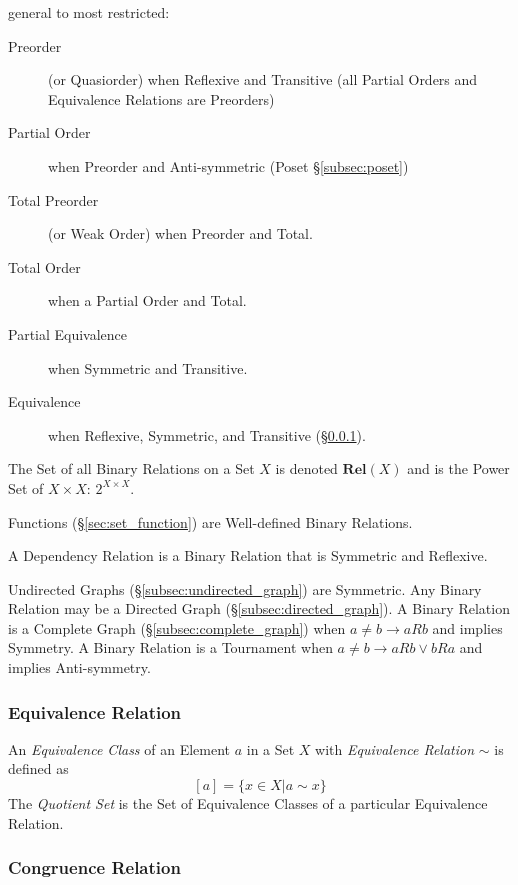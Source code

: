 \documentclass{article}
\begin{document}
general to most restricted:
\begin{description}
\item[Preorder] (or Quasiorder) when Reflexive and Transitive (all
  Partial Orders and Equivalence Relations are Preorders)
\item[Partial Order] when Preorder and Anti-symmetric (Poset
  \S\ref{subsec:poset})
\item[Total Preorder] (or Weak Order) when Preorder and Total.
\item[Total Order] when a Partial Order and Total.
\item[Partial Equivalence] when Symmetric and Transitive.
\item[Equivalence] when Reflexive, Symmetric, and Transitive
  (\S\ref{subsec:equivalence_relation}).
\end{description}

The Set of all Binary Relations on a Set $X$ is denoted
$\mathbf{Rel}(X)$ and is the Power Set of $X \times X$: $2^{X \times
  X}$.

Functions (\S\ref{sec:set_function}) are Well-defined Binary Relations.

A Dependency Relation is a Binary Relation that is Symmetric and
Reflexive.

Undirected Graphs (\S\ref{subsec:undirected_graph}) are Symmetric.
Any Binary Relation may be a Directed Graph
(\S\ref{subsec:directed_graph}). A Binary Relation is a Complete Graph
(\S\ref{subsec:complete_graph}) when $a \neq b \rightarrow aRb$ and
implies Symmetry. A Binary Relation is a Tournament when $a \neq b
\rightarrow aRb \vee bRa$ and implies Anti-symmetry.

\subsubsection{Equivalence Relation}\label{subsec:equivalence_relation}

An \emph{Equivalence Class} of an Element $a$ in a Set $X$ with
\emph{Equivalence Relation} $\sim$ is defined as
\[
    [a] = \{x \in X | a \sim x\}
\]
The \emph{Quotient Set} is the Set of Equivalence Classes of a
particular Equivalence Relation.

\subsubsection{Congruence Relation}\label{subsec:congruence_relation}
\end{document}
